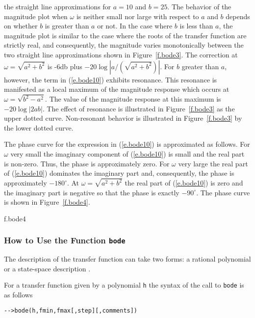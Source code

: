 %
the straight line approximations for $a=10$ and $b=25$.  The behavior of
the magnitude plot when $\omega$ is neither small nor large with
respect to $a$ and $b$ depends on whether $b$ is greater than
$a$ or not.  In the case where $b$ is less than $a$, the
magnitude plot is similar to the case where the roots of the transfer
function are strictly real, and consequently, the magnitude varies 
monotonically between the two straight line approximations
shown in Figure~\ref{f.bode3}.  The correction at $\omega=\sqrt{a^2+b^2}$
is -6db plus $-20\log|a/(\sqrt{a^2+b^2})|$.  For $b$ greater than $a$,
however, the term in (\ref{e.bode10}) exhibits resonance.  This 
resonance is manifested as a local maximum of the magnitude response
which occurs at $\omega=\sqrt{b^2-a^2}$.  The value of the magnitude
response at this maximum is $-20\log|2ab|$.  The effect of resonance
is illustrated in Figure~\ref{f.bode3} as the upper dotted curve. 
Non-resonant behavior is illustrated in Figure~\ref{f.bode3} by the
lower dotted curve.

	The phase curve for the expression in (\ref{e.bode10})
is approximated as follows.  For $\omega$ very small the imaginary
component of (\ref{e.bode10}) is small and the real part
is non-zero.  Thus, the phase is approximately zero.
For $\omega$ very large the real part of (\ref{e.bode10}) dominates the
imaginary part and, consequently, the phase is approximately
$-180^{\circ}$.  At $\omega=\sqrt{a^2+b^2}$ the real part of (\ref{e.bode10})
is zero and the imaginary part is negative so that the phase is exactly
$-90^{\circ}$.  The phase curve is shown in Figure~\ref{f.bode4}.
%

{f.bode4}

%

\subsubsection{How to Use the Function {\tt bode}}

	 The description of the transfer function can take
two forms: a rational polynomial or a state-space description .

	For a transfer function given by a polynomial {\tt h}
the syntax of the call to {\tt bode} is as follows
\begin{verbatim}
-->bode(h,fmin,fmax[,step][,comments])
\end{verbatim}

